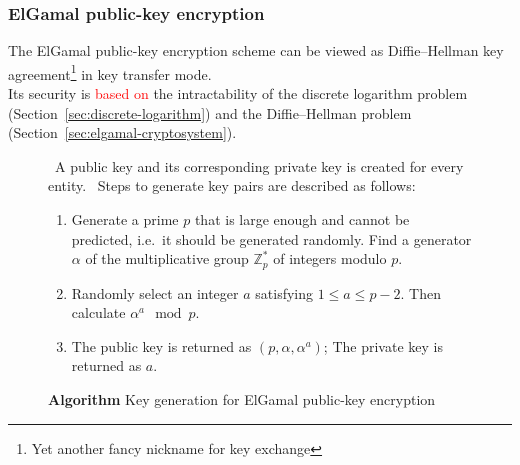 \documentclass[hyperref=true]{beamer}
\begin{document}
\begin{frame}
  \frametitle{ElGamal public-key encryption}
The ElGamal public-key encryption scheme can be viewed as
Diffie--Hellman key agreement\footnote{Yet another fancy nickname for
  key exchange} in key transfer mode.\\
Its security is \textcolor{red}{based on} the intractability of the
discrete logarithm problem (Section~\ref{sec:discrete-logarithm}) and
the Diffie–Hellman problem (Section~\ref{sec:elgamal-cryptosystem}).
\end{frame}


\begin{frame}
  \begin{figure}
    \centering
  \begin{algorithmic}
    \ENSURE~A public key and its corresponding private key is created
    for every entity.
    \STATE~Steps to generate key pairs are described as follows:
    \begin{enumerate}
    \item Generate a prime $p$ that is large enough and cannot be
      predicted, i.e.\ it should be generated randomly. Find a
      generator $\alpha$ of the multiplicative group $\mathbb{Z}_{p}^{*}$ of
      integers modulo $p$.
    \item Randomly select an integer $a$ satisfying $1\leq
      a\leq p-2$. Then calculate $\alpha^{a}\mod p$.
    \item The public key is returned as $(p,\alpha,\alpha^{a})$; The
      private key is returned as $a$.
    \end{enumerate}
  \end{algorithmic}
  \caption{\textbf{Algorithm} Key generation for ElGamal public-key encryption}
  \label{fig:basic-elgamal-encryption}
  \end{figure}
\end{frame}
\end{document}
